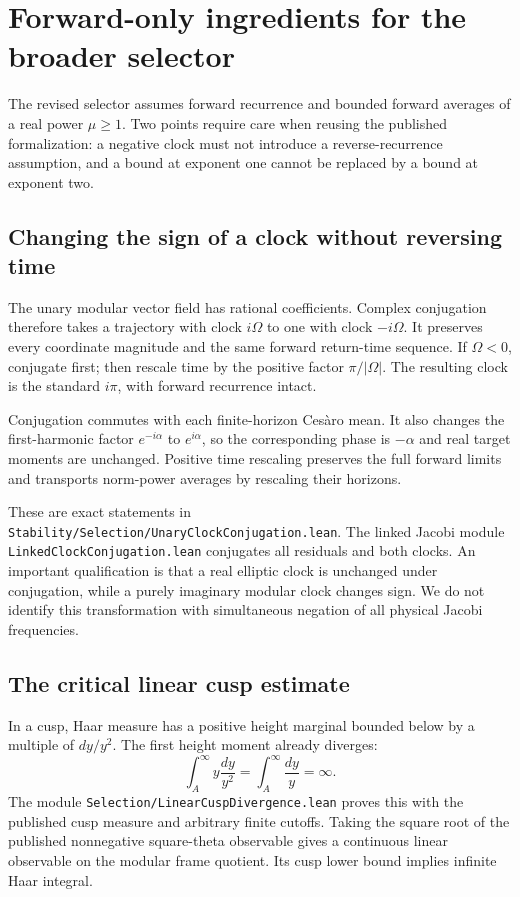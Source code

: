 \documentclass[11pt]{article}
\newcommand{\code}[1]{{\small\nolinkurl{#1}}}
\begin{document}
\section{Forward-only ingredients for the broader selector}

The revised selector assumes forward recurrence and bounded forward
averages of a real power $\mu\ge1$. Two points require care when reusing
the published formalization: a negative clock must not introduce a
reverse-recurrence assumption, and a bound at exponent one cannot be
replaced by a bound at exponent two.

\subsection{Changing the sign of a clock without reversing time}

The unary modular vector field has rational coefficients. Complex
conjugation therefore takes a trajectory with clock $i\Omega$ to one
with clock $-i\Omega$. It preserves every coordinate magnitude and the
same forward return-time sequence. If $\Omega<0$, conjugate first; then
rescale time by the positive factor $\pi/|\Omega|$. The resulting clock
is the standard $i\pi$, with forward recurrence intact.

Conjugation commutes with each finite-horizon Ces\`aro mean. It also
changes the first-harmonic factor $e^{-i\alpha}$ to $e^{i\alpha}$, so
the corresponding phase is $-\alpha$ and real target moments are
unchanged. Positive time rescaling preserves the full forward limits and
transports norm-power averages by rescaling their horizons.

These are exact statements in
\code{Stability/Selection/UnaryClockConjugation.lean}. The linked
Jacobi module \code{LinkedClockConjugation.lean} conjugates all residuals
and both clocks. An important qualification is that a real elliptic clock
is unchanged under conjugation, while a purely imaginary modular clock
changes sign. We do not identify this transformation with simultaneous
negation of all physical Jacobi frequencies.

\subsection{The critical linear cusp estimate}

In a cusp, Haar measure has a positive height marginal bounded below by
a multiple of $dy/y^2$. The first height moment already diverges:
\[
 \int_A^\infty y\frac{dy}{y^2}=\int_A^\infty\frac{dy}{y}=\infty.
\]
The module \code{Selection/LinearCuspDivergence.lean} proves this with the
published cusp measure and arbitrary finite cutoffs. Taking the square root
of the published nonnegative square-theta observable gives a continuous
linear observable on the modular frame quotient. Its cusp lower bound
implies infinite Haar integral.
\end{document}
